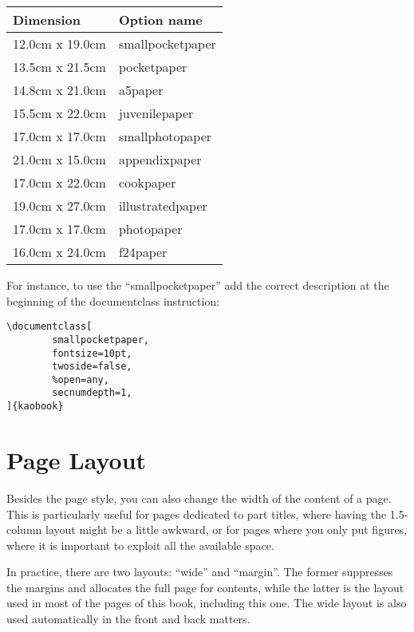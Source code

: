\begin{margintable}[*-6]
	\caption{Some non-standard paper sizes supported by kaobook.}
	\begin{tabular}{ll}
		\toprule
		Dimension & Option name \\
		\midrule
		12.0cm x 19.0cm & smallpocketpaper \\
		13.5cm x 21.5cm & pocketpaper \\
		14.8cm x 21.0cm & a5paper \\
		15.5cm x 22.0cm & juvenilepaper \\
		17.0cm x 17.0cm & smallphotopaper \\
		21.0cm x 15.0cm & appendixpaper \\
		17.0cm x 22.0cm & cookpaper \\
		19.0cm x 27.0cm & illustratedpaper \\
		17.0cm x 17.0cm & photopaper \\
		16.0cm x 24.0cm & f24paper \\
		\bottomrule
	\end{tabular}
\end{margintable}

For instance, to use the \enquote{smallpocketpaper} add the correct 
description at the beginning of the documentclass instruction:
\begin{lstlisting}
\documentclass[
		smallpocketpaper,
		fontsize=10pt,
		twoside=false,
		%open=any,
		secnumdepth=1,
]{kaobook}
\end{lstlisting}

\section{Page Layout}

Besides the page style, you can also change the width of the content of 
a page. This is particularly useful for pages dedicated to part titles, 
where having the 1.5-column layout might be a little awkward, or for 
pages where you only put figures, where it is important to exploit all 
the available space.

In practice, there are two layouts: \enquote{wide} and \enquote{margin}. 
The former suppresses the margins and allocates the full page for 
contents, while the latter is the layout used in most of the pages of 
this book, including this one. The wide layout is also used 
automatically in the front and back matters.

